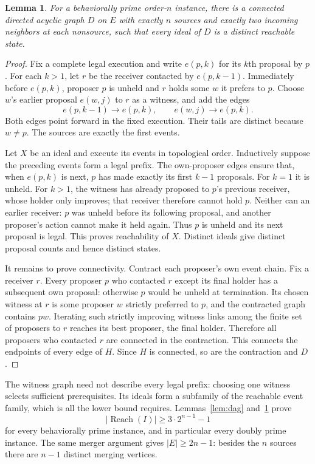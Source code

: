 \documentclass[11pt]{article}
\newtheorem{lemma}[theorem]{Lemma}
\newcommand{\Reach}{\operatorname{Reach}}
\begin{document}
\begin{lemma}\label{lem:witness}
For a behaviorally prime order-$n$ instance, there is a connected
directed acyclic graph $D$ on $E$ with exactly $n$ sources and exactly two
incoming neighbors at each nonsource, such that every ideal of $D$ is a
distinct reachable state.
\end{lemma}
\begin{proof}
Fix a complete legal execution and write $e(p,k)$ for its $k$th proposal
by $p$. For each $k>1$, let $r$ be the receiver contacted by
$e(p,k-1)$. Immediately before $e(p,k)$, proposer $p$ is unheld and $r$
holds some $w$ it prefers to $p$. Choose $w$'s earlier proposal $e(w,j)$
to $r$ as a witness, and add the edges
\[
       e(p,k-1)\longrightarrow e(p,k),\qquad
       e(w,j)\longrightarrow e(p,k).
\]
Both edges point forward in the fixed execution. Their tails are
distinct because $w\ne p$. The sources are exactly the first events.

Let $X$ be an ideal and execute its events in topological order.
Inductively suppose the preceding events form a legal prefix. The
own-proposer edges ensure that, when $e(p,k)$ is next, $p$ has made
exactly its first $k-1$ proposals. For $k=1$ it is unheld. For $k>1$, the
witness has already proposed to $p$'s previous receiver, whose holder
only improves; that receiver therefore cannot hold $p$. Neither can an
earlier receiver: $p$ was unheld before its following proposal, and
another proposer's action cannot make it held again. Thus $p$ is unheld
and its next proposal is legal. This proves reachability of $X$.
Distinct ideals give distinct proposal counts and hence distinct states.

It remains to prove connectivity. Contract each proposer's own event
chain. Fix a receiver $r$. Every proposer $p$ who contacted $r$ except
its final holder has a subsequent own proposal: otherwise $p$ would be
unheld at termination. Its chosen witness at $r$ is some proposer $w$
strictly preferred to $p$, and the contracted graph contains $p w$.
Iterating such strictly improving witness links among the finite set of
proposers to $r$ reaches its best proposer, the final holder. Therefore
all proposers who contacted $r$ are connected in the contraction. This
connects the endpoints of every edge of $H$. Since $H$ is connected, so
are the contraction and $D$.
\end{proof}

The witness graph need not describe every legal prefix: choosing one
witness selects sufficient prerequisites. Its ideals form a subfamily
of the reachable event family, which is all the lower bound requires.
Lemmas~\ref{lem:dag} and~\ref{lem:witness} prove
\[
       |\Reach(I)|\ge3\cdot2^{n-1}-1
\]
for every behaviorally prime instance, and in particular every doubly
prime instance. The same merger argument gives $|E|\ge2n-1$: besides
the $n$ sources there are $n-1$ distinct merging vertices.
\end{document}
